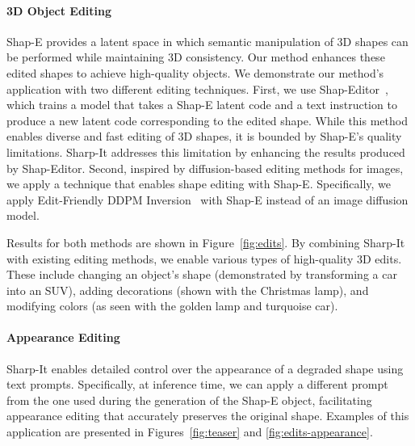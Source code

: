 \vspace{-12pt}
\paragraph{3D Object Editing}



Shap-E provides a latent space in which semantic manipulation of 3D shapes can be performed while maintaining 3D consistency. Our method enhances these edited shapes to achieve high-quality objects. We demonstrate our method's application with two different editing techniques.
First, we use Shap-Editor~\cite{chen2023shapeditor}, which trains a model that takes a Shap-E latent code and a text instruction to produce a new latent code corresponding to the edited shape. While this method enables diverse and fast editing of 3D shapes, it is bounded by Shap-E's quality limitations. Sharp-It addresses this limitation by enhancing the results produced by Shap-Editor.
Second, inspired by diffusion-based editing methods for images, we apply a technique that enables shape editing with Shap-E. Specifically, we apply Edit-Friendly DDPM Inversion~\cite{huberman2024edit} with Shap-E instead of an image diffusion model.

Results for both methods are shown in Figure~\ref{fig:edits}. By combining Sharp-It with existing editing methods, we enable various types of high-quality 3D edits. These include changing an object's shape (demonstrated by transforming a car into an SUV), adding decorations (shown with the Christmas lamp), and modifying colors (as seen with the golden lamp and turquoise car).

\vspace{-16pt}
\paragraph{Appearance Editing}\label{sec:app-edit}
Sharp-It enables detailed control over the appearance of a degraded shape using text prompts. Specifically, at inference time, we can apply a different prompt from the one used during the generation of the Shap-E object, facilitating appearance editing that accurately preserves the original shape. Examples of this application are presented in Figures~\ref{fig:teaser} and \ref{fig:edits-appearance}.

% 


\vspace{-14pt}
